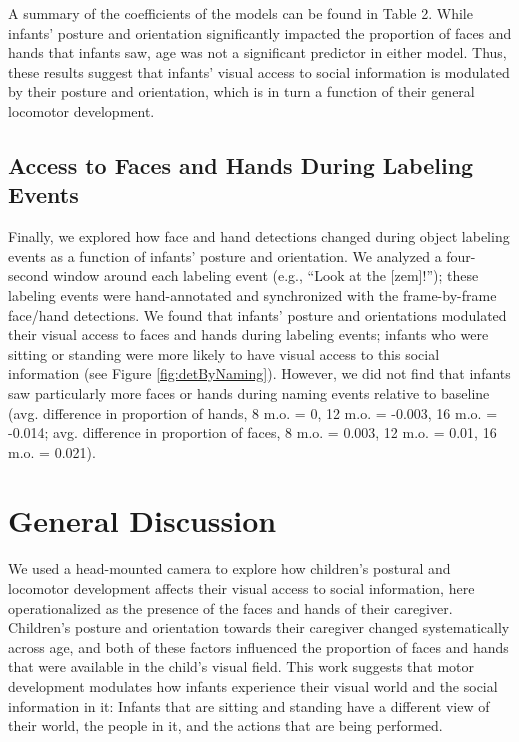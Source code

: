 \documentclass[10pt, letterpaper]{article}
\begin{document}
A summary of the coefficients of the models can be found in Table 2.
While infants' posture and orientation significantly impacted the
proportion of faces and hands that infants saw, age was not a
significant predictor in either model. Thus, these results suggest that
infants' visual access to social information is modulated by their
posture and orientation, which is in turn a function of their general
locomotor development.

\subsection{Access to Faces and Hands During Labeling
Events}\label{access-to-faces-and-hands-during-labeling-events}

Finally, we explored how face and hand detections changed during object
labeling events as a function of infants' posture and orientation. We
analyzed a four-second window around each labeling event (e.g., ``Look
at the {[}zem{]}!''); these labeling events were hand-annotated and
synchronized with the frame-by-frame face/hand detections. We found that
infants' posture and orientations modulated their visual access to faces
and hands during labeling events; infants who were sitting or standing
were more likely to have visual access to this social information (see
Figure \ref{fig:detByNaming}). However, we did not find that infants saw
particularly more faces or hands during naming events relative to
baseline (avg. difference in proportion of hands, 8 m.o. = 0, 12 m.o. =
-0.003, 16 m.o. = -0.014; avg. difference in proportion of faces, 8 m.o.
= 0.003, 12 m.o. = 0.01, 16 m.o. = 0.021).

\section{General Discussion}\label{general-discussion}

We used a head-mounted camera to explore how children's postural and
locomotor development affects their visual access to social information,
here operationalized as the presence of the faces and hands of their
caregiver. Children's posture and orientation towards their caregiver
changed systematically across age, and both of these factors influenced
the proportion of faces and hands that were available in the child's
visual field. This work suggests that motor development modulates how
infants experience their visual world and the social information in it:
Infants that are sitting and standing have a different view of their
world, the people in it, and the actions that are being performed.
\end{document}
